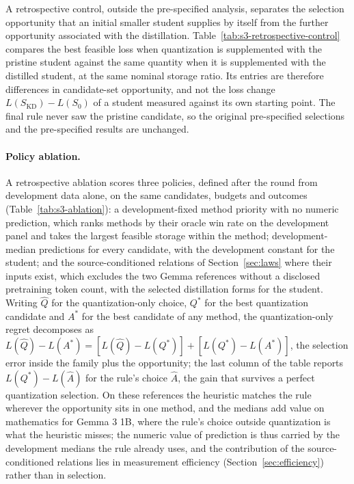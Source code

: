 A retrospective control, outside the pre-specified analysis, separates the selection opportunity that an
initial smaller student supplies by itself from the further opportunity associated with the
distillation. Table~\ref{tab:s3-retrospective-control} compares the best feasible loss when
quantization is supplemented with the pristine student against the same quantity when it is
supplemented with the distilled student, at the same nominal storage ratio. Its entries are
therefore differences in candidate-set opportunity, and not the loss change
$L(S_{\mathrm{KD}})-L(S_0)$ of a student measured against its own starting point. The final rule
never saw the pristine candidate, so the original pre-specified selections and the pre-specified results are
unchanged.


\paragraph{Policy ablation.} A retrospective ablation scores three policies, defined after the
round from development data alone, on the same candidates, budgets and outcomes
(Table~\ref{tab:s3-ablation}): a development-fixed method priority with no numeric prediction,
which ranks methods by their oracle win rate on the development panel and takes the largest
feasible storage within the method; development-median predictions for every candidate, with the
development constant for the student; and the source-conditioned relations of
Section~\ref{sec:laws} where their inputs exist, which excludes the two Gemma references without a
disclosed pretraining token count, with the selected distillation forms for the student. Writing
$\widehat Q$ for the quantization-only choice, $Q^*$ for the best quantization candidate and $A^*$
for the best candidate of any method, the quantization-only regret decomposes as
$L(\widehat Q)-L(A^*)=[L(\widehat Q)-L(Q^*)]+[L(Q^*)-L(A^*)]$, the selection error inside the family
plus the opportunity; the last column of the table reports $L(Q^*)-L(\widehat A)$ for the rule's
choice $\widehat A$, the gain that survives a perfect quantization selection. On these references the heuristic matches the rule wherever the opportunity sits in one method, and
the medians add value on mathematics for Gemma 3 1B, where the rule's choice outside quantization is
what the heuristic misses; the numeric value of prediction is thus carried by the development
medians the rule already uses, and the contribution of the source-conditioned relations lies in
measurement efficiency (Section~\ref{sec:efficiency}) rather than in selection.


